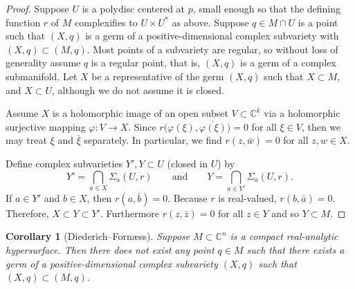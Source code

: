 \documentclass[12pt,openany]{book}
\newcommand{\C}{{\mathbb{C}}}
\theoremstyle{plain}
\newtheorem{cor}[thm]{Corollary}
\theoremstyle{remark}
\theoremstyle{definition}
\theoremstyle{exercise}
\theoremstyle{example}
\begin{document}
\begin{proof}
Suppose $U$ is a polydisc centered at $p$,
small enough so that the defining function
$r$ of $M$ complexifies to $U \times U^*$ as above.
Suppose $q \in M \cap U$ is a point such that $(X,q)$ is a germ of a
positive-dimensional complex subvariety with $(X,q) \subset (M,q)$.
Most points of a subvariety are regular, so
without loss of generality assume $q$ is a regular point, that is,
$(X,q)$ is a germ of a complex submanifold.
Let $X$ be a representative of the germ $(X,q)$ such that $X \subset M$,
and $X \subset U$, although we do not assume it is closed.


Assume $X$ is a holomorphic
image of an open subset $V \subset \C^k$ via a holomorphic surjective mapping $\varphi \colon V \to
X$.  Since $r\bigl(\varphi(\xi),\overline{\varphi(\xi)}\bigr) = 0$
for all $\xi \in V$, then we may treat $\xi$ and $\bar{\xi}$ separately.
In particular, we find 
$r(z,\bar{w}) = 0$ for all $z,w \in X$.

Define complex subvarieties $Y', Y \subset U$ (closed in $U$) by
\begin{equation*}
Y' = \bigcap_{a \in X} \Sigma_a(U,r) 
\qquad \text{and} \qquad
Y = \bigcap_{a \in Y'} \Sigma_a(U,r) .
\end{equation*}
If $a \in Y'$ and $b \in X$, then $r(a,\bar{b}) = 0$.
Because $r$ is real-valued,
$r(b,\bar{a}) = 0$.  Therefore,
$X \subset Y \subset Y'$.  Furthermore $r(z,\bar{z}) = 0$
for all $z \in Y$ and so $Y \subset M$.
\end{proof}

\begin{cor}[Diederich--Forn\ae ss]
Suppose $M \subset \C^n$ is a compact real-analytic hypersurface.
Then there does not exist any point $q \in M$ such that
there exists a germ of a positive-dimensional complex subvariety
$(X,q)$ such that $(X,q) \subset (M,q)$.
\end{cor}
\end{document}
